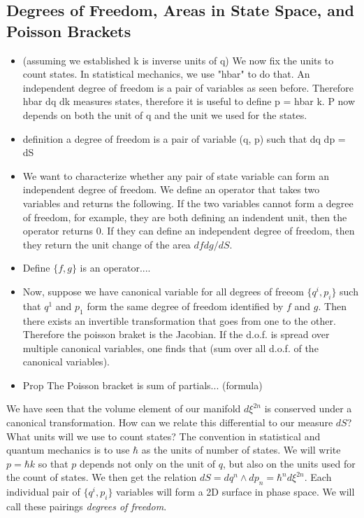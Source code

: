 \documentclass{article}
\begin{document}
\subsection{Degrees of Freedom, Areas in State Space, and Poisson Brackets}
\begin{itemize}
	
	\item (assuming we established k is inverse units of q) We now fix the units to count states. In statistical mechanics, we use "hbar" to do that. An independent degree of freedom is a pair of variables as seen before. Therefore hbar dq dk measures states, therefore it is useful to define p = hbar k. P now depends on both the unit of q and the unit we used for the states.
	
	\item definition a degree of freedom is a pair of variable (q, p) such that dq dp = dS
	
	\item We want to characterize whether any pair of state variable can form an independent degree of freedom. We define an operator that takes two variables and returns the following. If the two variables cannot form a degree of freedom, for example, they are both defining an indendent unit, then the operator returns 0. If they can define an independent degree of freedom, then they return the unit change of the area $df dg/dS$.
	
	\item Define $\{ f , g\}$ is an operator....
	
	\item Now, suppose we have canonical variable for all degrees of freeom $\{q^i, p_i\}$ such that $q^1$ and $p_1$ form the same degree of freedom identified by $f$ and $g$. Then there exists an invertible transformation that goes from one to the other. Therefore the poisson braket is the Jacobian. If the d.o.f. is spread over multiple canonical variables, one finds that (sum over all d.o.f. of the canonical variables).
	
	\item Prop The Poisson bracket is sum of partials... (formula)
\end{itemize}

	We have seen that the volume element of our manifold $d \xi^{2n}$ is conserved under a canonical transformation. How can we relate this differential to our measure $dS$? What units will we use to count states? The convention in statistical and quantum mechanics is to use $\hbar$ as the units of number of states. We will write $p = \hbar k$ so that $p$ depends not only on the unit of $q$, but also on the units used for the count of states. We then get the relation $dS = dq^n \land dp_n = \hbar^n d\xi^{2n}$. Each individual pair of $\{q^i,p_i\}$  variables will form a 2D surface in phase space. We will call these pairings \textit{degrees of freedom}.
\end{document}
